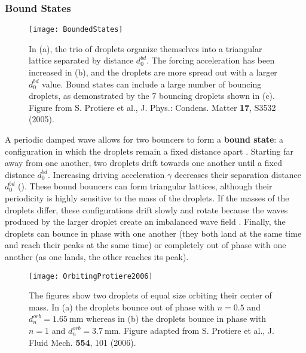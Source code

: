  \subsubsection{Bound States}

\begin{figure}[h]
	       \centering
	    \texttt{[image: BoundedStates]}
	     \caption{In (a), the trio of droplets organize themselves into a triangular lattice separated by distance $d_{0}^{bd}$. The forcing acceleration has been increased in (b), and the droplets are more spread out with a larger $d_{0}^{bd}$ value. Bound states can include a large number of bouncing droplets, as demonstrated by the 7 bouncing droplets shown in (c).   
	    Figure from S. Protiere et al., J. Phys.: Condens. Matter \textbf{17}, S3532 (2005). 
	     }
	 \label{bounded}
	\end{figure}
            A periodic damped wave allows for two bouncers to form a \textbf{bound state}: a configuration in which the droplets remain a fixed distance apart .  Starting far away from one another, two droplets drift towards one another until a fixed distance $d_{0}^{bd}$. Increasing driving acceleration $\gamma$ decreases their separation distance $d_{0}^{bd}$ (). These bound bouncers can form triangular lattices, although their periodicity is highly sensitive to the mass of the droplets. If the masses of the droplets differ, these configurations drift slowly and rotate because the waves produced by the larger droplet create an imbalanced wave field . Finally, the droplets can bounce in phase with one another (they both land at the same time and reach their peaks at the same time) or completely out of phase with one another (as one lands, the other reaches its peak).
            
\begin{figure}[h]
	       \centering
	    \texttt{[image: OrbitingProtiere2006]}
	     \caption{ The figures show two droplets of equal size orbiting their center of mass. In (a) the droplets bounce out of phase with $n = 0.5$ and $d_{n}^{orb} =1.65~\mathrm{mm}$ whereas in (b) the droplets bounce in phase with  $n=1$ and  $d_{n}^{orb} = 3.7~\mathrm{mm}$.
	    Figure adapted from S. Protiere et al., J. Fluid Mech. \textbf{554}, 101 (2006). 
	     }
	 \label{orbiting}
	\end{figure}
 

